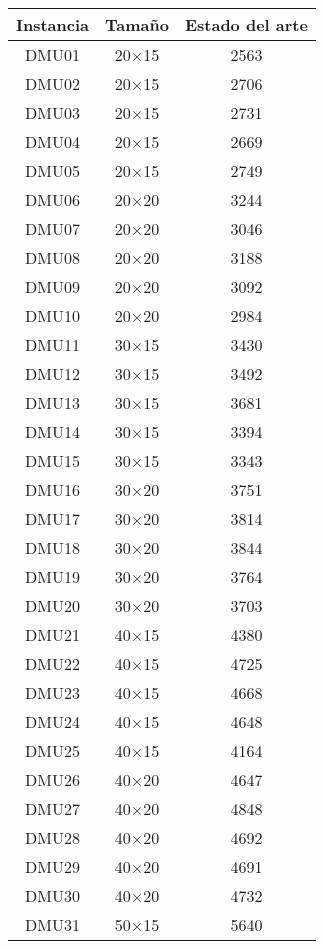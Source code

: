 \begin{table}[H]
\centering
\begin{tabular}{@{}ccc@{}}
\toprule
Instancia & Tamaño & Estado del arte \\ \midrule
DMU01 & 20$\times$15 & 2563\\ 
DMU02 & 20$\times$15 & 2706\\ 
DMU03 & 20$\times$15 & 2731\\ 
DMU04 & 20$\times$15 & 2669\\ 
DMU05 & 20$\times$15 & 2749\\ 
DMU06 & 20$\times$20 & 3244\\ 
DMU07 & 20$\times$20 & 3046\\ 
DMU08 & 20$\times$20 & 3188\\ 
DMU09 & 20$\times$20 & 3092\\ 
DMU10 & 20$\times$20 & 2984\\ 
DMU11 & 30$\times$15 & 3430\\ 
DMU12 & 30$\times$15 & 3492\\ 
DMU13 & 30$\times$15 & 3681\\ 
DMU14 & 30$\times$15 & 3394\\ 
DMU15 & 30$\times$15 & 3343\\ 
DMU16 & 30$\times$20 & 3751\\ 
DMU17 & 30$\times$20 & 3814\\ 
DMU18 & 30$\times$20 & 3844\\ 
DMU19 & 30$\times$20 & 3764\\ 
DMU20 & 30$\times$20 & 3703\\ 
DMU21 & 40$\times$15 & 4380\\ 
DMU22 & 40$\times$15 & 4725\\ 
DMU23 & 40$\times$15 & 4668\\ 
DMU24 & 40$\times$15 & 4648\\ 
DMU25 & 40$\times$15 & 4164\\ 
DMU26 & 40$\times$20 & 4647\\ 
DMU27 & 40$\times$20 & 4848\\ 
DMU28 & 40$\times$20 & 4692\\ 
DMU29 & 40$\times$20 & 4691\\ 
DMU30 & 40$\times$20 & 4732\\ 
DMU31 & 50$\times$15 & 5640\\ 

\end{tabular}
\end{table}
